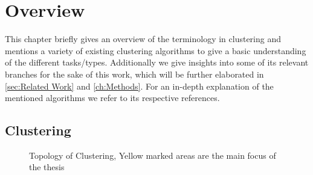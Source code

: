 \chapter{Overview}

This chapter briefly gives an overview of the terminology in clustering and mentions a variety of existing clustering algorithms to give a basic understanding of the different tasks/types. Additionally we give insights into some of its relevant branches for the sake of this work, which will be further elaborated in \autoref{sec:Related Work} and \autoref{ch:Methods}. For an in-depth explanation of the mentioned algorithms we refer to its respective references.

\section{Clustering}\label{sec:clu}
\cite{kriegel2009clustering}

\begin{figure}
    \centering
    \caption{Topology of Clustering, Yellow marked areas are the main focus of the thesis}
    \label{fig:my_label}
\end{figure}

